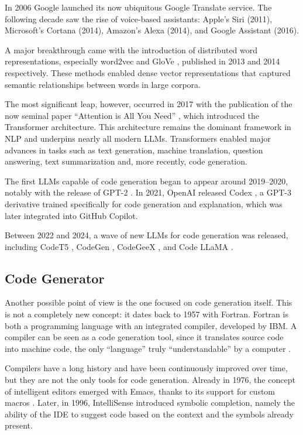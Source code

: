 In 2006 Google launched its now ubiquitous Google 
Translate service. The following decade saw the rise of voice-based 
assistants: Apple’s Siri (2011), Microsoft’s Cortana (2014), 
Amazon’s Alexa (2014), and Google Assistant (2016).

A major breakthrough came with the introduction of distributed word 
representations, especially word2vec \cite{mikolov2013efficient} and 
GloVe \cite{pennington2014glove}, published in 2013 and 2014 respectively. 
These methods enabled dense vector representations that captured semantic 
relationships between words in large corpora.

The most significant leap, however, occurred in 2017 with the publication 
of the now seminal paper “Attention is All You Need” 
\cite{vaswani2017attention}, which introduced the Transformer 
architecture. This architecture remains the dominant framework in 
NLP and underpins nearly all modern LLMs. Transformers enabled major 
advances in tasks such as text generation, machine translation, 
question answering, text summarization and, more recently, code 
generation.

The first LLMs capable of code generation began to appear around 
2019–2020, notably with the release of GPT-2 \cite{radford2019language}. 
In 2021, OpenAI released Codex \cite{chen2021codex}, a GPT-3 derivative 
trained specifically for code generation and explanation, which was
later integrated into GitHub Copilot.

Between 2022 and 2024, a wave of new LLMs for code generation was 
released, including CodeT5 \cite{wang2021codet5}, CodeGen 
\cite{nijkamp2022codegen}, CodeGeeX \cite{zeng2022codegeex}, 
and Code LLaMA \cite{roziere2023code}.


\subsection{Code Generator} %
\label{sec:Code_Generator}
Another possible point of view is the one focused on code 
generation itself. This is not a  completely new concept: 
it dates back to 1957 with Fortran. Fortran is both a 
programming language with an integrated compiler, developed by IBM. 
A compiler can be seen as a code generation tool, since it 
translates source code into machine code, the only “language” 
truly “understandable” by a computer \cite{backus1957fortran}.

Compilers have a long history and have been continuously 
improved over time, but they are not the only tools for code 
generation. Already in 1976, the concept of intelligent editors 
emerged with Emacs, thanks to its support for custom macros 
\cite{stallman1981emacs}. Later, in 1996, IntelliSense 
introduced symbolic completion, namely the ability of the IDE 
to suggest code based on the context and the symbols already present.

